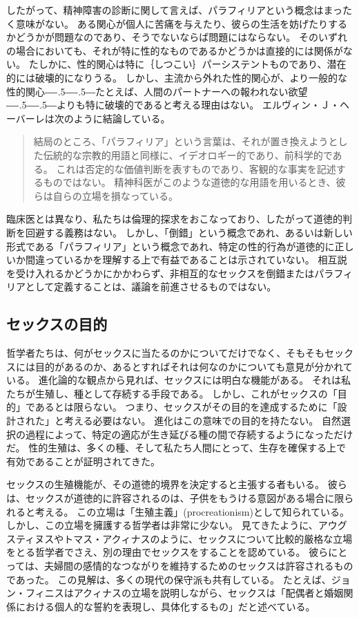 \documentclass[paper=a4,book,openany]{jlreq}
\def\DDASH{―\kern-.5\zw―\kern-.5\zw―} %
\begin{document}
したがって、精神障害の診断に関して言えば、パラフィリアという概念はまったく意味がない。
ある関心が個人に苦痛を与えたり、彼らの生活を妨げたりするかどうかが問題なのであり、そうでないならば問題にはならない。
そのいずれの場合においても、それが特に性的なものであるかどうかは直接的には関係がない。
たしかに、性的関心は特に｛しつこい｝{パーシステント}ものであり、潜在的には破壊的になりうる。
しかし、主流から外れた性的関心が、より一般的な性的関心{\DDASH}たとえば、人間のパートナーへの報われない欲望{\DDASH}よりも特に破壊的であると考える理由はない。
エルヴィン・Ｊ・ヘーバーレは次のように結論している。

\begin{quote}
  結局のところ、「パラフィリア」という言葉は、それが置き換えようとした伝統的な宗教的用語と同様に、イデオロギー的であり、前科学的である。
これは否定的な価値判断を表すものであり、客観的な事実を記述するものではない。
精神科医がこのような道徳的な用語を用いるとき、彼らは自らの立場を損なっている。
\citep{haeberle16:_parap}

\end{quote}

臨床医とは異なり、私たちは倫理的探求をおこなっており、したがって道徳的判断を回避する義務はない。
しかし、「倒錯」という概念であれ、あるいは新しい形式である「パラフィリア」という概念であれ、特定の性的行為が道徳的に正しいか間違っているかを理解する上で有益であることは示されていない。
相互説を受け入れるかどうかにかかわらず、非相互的なセックスを倒錯またはパラフィリアとして定義することは、議論を前進させるものではない。

\subsection{セックスの目的}

哲学者たちは、何がセックスに当たるのかについてだけでなく、そもそもセックスには目的があるのか、あるとすればそれは何なのかについても意見が分かれている。
進化論的な観点から見れば、セックスには明白な機能がある。
それは私たちが生殖し、種として存続する手段である。
しかし、これがセックスの「目的」であるとは限らない。
つまり、セックスがその目的を達成するために「設計された」と考える必要はない。
進化はこの意味での目的を持たない。
自然選択の過程によって、特定の適応が生き延びる種の間で存続するようになっただけだ。
性的生殖は、多くの種、そして私たち人間にとって、生存を確保する上で有効であることが証明されてきた。

セックスの生殖機能が、その道徳的境界を決定すると主張する者もいる。
彼らは、セックスが道徳的に許容されるのは、子供をもうける意図がある場合に限られると考える。
この立場は「生殖主義」(procreationism)として知られている。
しかし、この立場を擁護する哲学者は非常に少ない。
見てきたように、アウグスティヌスやトマス・アクィナスのように、セックスについて比較的厳格な立場をとる哲学者でさえ、別の理由でセックスをすることを認めている。
彼らにとっては、夫婦間の感情的なつながりを維持するためのセックスは許容されるものであった。
この見解は、多くの現代の保守派も共有している。
たとえば、ジョン・フィニスはアクィナスの立場を説明しながら、セックスは「配偶者と婚姻関係における個人的な誓約を表現し、具体化するもの」だと述べている\citep[p.392]{finnis08:_marriag}。
\end{document}
